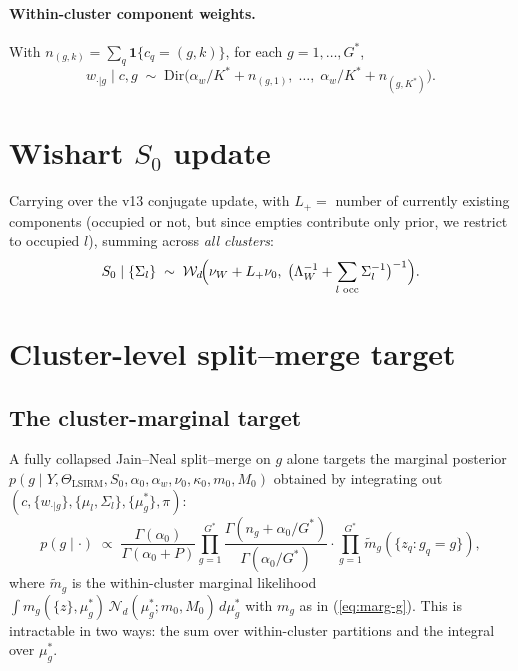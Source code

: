 \documentclass[11pt]{article}
\newcommand{\ind}{\mathbf{1}}
\newcommand{\Dir}{\mathrm{Dir}}
\begin{document}
\paragraph{Within-cluster component weights.} With $n_{(g,k)}=\sum_q\ind\{c_q=(g,k)\}$,
for each $g=1,\ldots,G^*$,
\begin{equation}
w_{\cdot|g}\mid c,g \;\sim\; \Dir\!\bigl(\alpha_w/K^*+n_{(g,1)},\;\ldots,\;\alpha_w/K^*+n_{(g,K^*)}\bigr).
\label{eq:w-update}
\end{equation}

\section{Wishart $S_0$ update}
\label{sec:wishart}

Carrying over the v13 conjugate update, with $L_+ = $ number of currently
existing components (occupied or not, but since empties contribute only
prior, we restrict to occupied $l$), summing across \emph{all clusters}:
\begin{equation}
S_0\mid\{\Sigma_l\} \;\sim\; \mathcal{W}_d\!\Bigl(\nu_W+L_+\nu_0,\;
   \bigl(\Lambda_W^{-1}+\sum_{l\text{ occ}}\Sigma_l^{-1}\bigr)^{-1}\Bigr).
\label{eq:S0-update}
\end{equation}

\section{Cluster-level split--merge target}
\label{sec:splitmerge}

\subsection{The cluster-marginal target}

A fully collapsed Jain--Neal split--merge on $g$ alone targets the
marginal posterior $p(g\mid Y,\Theta_{\text{LSIRM}}, S_0,\alpha_0,\alpha_w,
\nu_0,\kappa_0,m_0,M_0)$ obtained by integrating out
$(c,\{w_{\cdot|g}\},\{\mu_l,\Sigma_l\},\{\mu_g^*\},\pi)$:
\begin{equation}
p(g\mid\cdot) \;\propto\;
   \frac{\Gamma(\alpha_0)}{\Gamma(\alpha_0+P)}
   \prod_{g=1}^{G^*}\frac{\Gamma(n_g+\alpha_0/G^*)}{\Gamma(\alpha_0/G^*)}
   \cdot \prod_{g=1}^{G^*}\widetilde m_g(\{z_q:g_q=g\}),
\label{eq:marg-target}
\end{equation}
where $\widetilde m_g$ is the within-cluster marginal likelihood
$\int m_g(\{z\},\mu_g^*)\,\mathcal{N}_d(\mu_g^*;m_0,M_0)\,d\mu_g^*$
with $m_g$ as in (\ref{eq:marg-g}). This is intractable in two ways:
the sum over within-cluster partitions and the integral over $\mu_g^*$.
\end{document}

